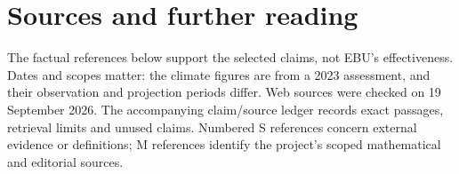 \chapter*{Sources and further reading}
The factual references below support the selected claims, not EBU's effectiveness. Dates and scopes matter: the climate figures are from a 2023 assessment, and their observation and projection periods differ. Web sources were checked on 19 September 2026. The accompanying claim/source ledger records exact passages, retrieval limits and unused claims. Numbered S references concern external evidence or definitions; M references identify the project's scoped mathematical and editorial sources.

\begingroup
\renewcommand{\chapter}[2]{}

